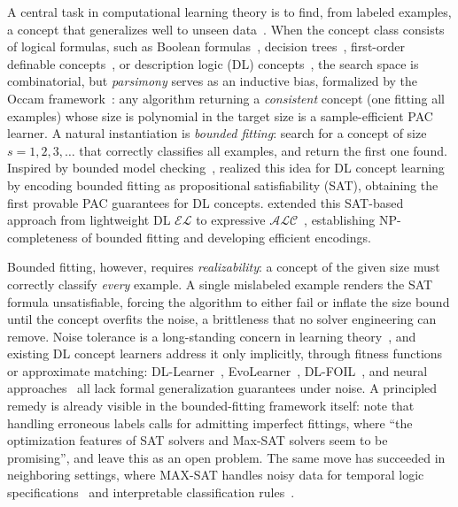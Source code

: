 \documentclass[accepted]{uai2026} %
\theoremstyle{definition}
\theoremstyle{remark}
\begin{document}
A central task in computational learning theory is to find, from
labeled examples, a concept that generalizes well to unseen
data~\citep{DBLP:journals/cacm/Valiant84}. When the concept class
consists of logical formulas, such as Boolean
formulas~\citep{DBLP:conf/stoc/KearnsLPV87,
DBLP:journals/jacm/PittV88}, decision
trees~\citep{DBLP:conf/aaai/GahlawatZ24}, first-order
definable concepts~\citep{DBLP:conf/lics/Bergerem19}, or description
logic (DL) concepts~\citep{DBLP:conf/colt/CohenH92,
DBLP:conf/ijcai/FunkJLPW19}, the search space is combinatorial, but
\emph{parsimony} serves as an inductive bias, formalized by
the Occam framework~\citep{DBLP:journals/jacm/BlumerEHW89,
DBLP:conf/stoc/BoardP90}: any algorithm
returning a \emph{consistent} concept (one fitting all
examples) whose size is polynomial in the target
size is a sample-efficient PAC learner. A natural instantiation is
\emph{bounded fitting}: search for a concept of size
$s = 1, 2, 3, \ldots$ that correctly classifies all examples, and
return the first one found. Inspired by bounded model
checking~\citep{DBLP:conf/tacas/BiereCCZ99},
\citet{DBLP:conf/ijcai/CateFJL23} realized this idea for DL concept
learning by encoding bounded fitting as propositional satisfiability
(SAT), obtaining the first provable PAC guarantees for DL concepts.
\citet{DBLP:conf/semweb/FunkJV25} extended this SAT-based approach
from lightweight DL $\mathcal{EL}$ to expressive
$\mathcal{ALC}$~\citep{DBLP:books/daglib/0041477}, establishing
NP-completeness of bounded fitting and developing efficient
encodings.

Bounded fitting, however, requires \emph{realizability}: a concept
of the given size must correctly classify \emph{every} example. A single mislabeled example renders the SAT formula
unsatisfiable,
forcing the algorithm to either fail or inflate the size bound until
the concept overfits the noise, a brittleness
that no solver engineering can remove.
Noise tolerance is a long-standing concern in learning
theory~\citep{DBLP:journals/ml/AngluinL87,
DBLP:journals/siamcomp/KearnsL93}, and existing DL concept learners
address it only implicitly, through fitness functions or approximate
matching: DL-Learner~\citep{DBLP:journals/ws/BuhmannLW16},
EvoLearner~\citep{DBLP:conf/www/HeindorfBDWGDN22},
DL-FOIL~\citep{DBLP:conf/ilp/FanizzidE08}, and neural
approaches~\citep{DBLP:conf/esws/KouagouHDN23} all lack formal
generalization guarantees under noise.
A principled remedy is already visible in the bounded-fitting
framework itself: \citet{DBLP:conf/ijcai/CateFJL23} note that
handling erroneous labels calls for admitting imperfect fittings,
where ``the optimization features of {SAT} solvers and Max-{SAT}
solvers seem to be promising'', and leave this as an open problem.
The same move has succeeded in neighboring settings, where MAX-SAT
handles noisy data for temporal logic
specifications~\citep{DBLP:conf/atva/GaglioneNRTX21} and
interpretable classification
rules~\citep{DBLP:conf/cp/MaliotovM18}.
\end{document}
